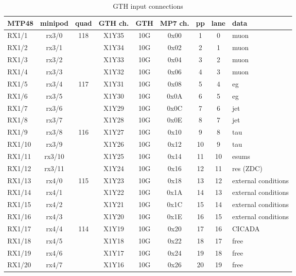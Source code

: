 \begin{longtable}{|l|c|c|c|c|c|c|c|l|}
\caption{GTH input connections}
    \label{tab:app:gth_i_conn}\\
\hline
\textbf{MTP48}& \textbf{minipod}& \textbf{quad}& \textbf{GTH ch.}& \textbf{GTH}& \textbf{MP7 ch.} &\textbf{pp}& \textbf{lane}& \textbf{data}\\
\hline
\hline
\endhead
RX1/1  & rx3/0  & 118 & X1Y35 & 10G & 0x00 & 1  & 0  & muon\\\hline
RX1/2  & rx3/1  &     & X1Y34 & 10G & 0x02 & 2  & 1  & muon\\\hline
RX1/3  & rx3/2  &     & X1Y33 & 10G & 0x04 & 3  & 2  & muon\\\hline
RX1/4  & rx3/3  &     & X1Y32 & 10G & 0x06 & 4  & 3  & muon\\\hline
RX1/5  & rx3/4  & 117 & X1Y31 & 10G & 0x08 & 5  & 4  & eg\\\hline
RX1/6  & rx3/5  &     & X1Y30 & 10G & 0x0A & 6  & 5  & eg\\\hline
RX1/7  & rx3/6  &     & X1Y29 & 10G & 0x0C & 7  & 6  & jet\\\hline
RX1/8  & rx3/7  &     & X1Y28 & 10G & 0x0E & 8  & 7  & jet\\\hline
RX1/9  & rx3/8  & 116 & X1Y27 & 10G & 0x10 & 9  & 8  & tau\\\hline
RX1/10 & rx3/9  &     & X1Y26 & 10G & 0x12 & 10 & 9  & tau\\\hline
RX1/11 & rx3/10 &     & X1Y25 & 10G & 0x14 & 11 & 10 & esums\\\hline
RX1/12 & rx3/11 &     & X1Y24 & 10G & 0x16 & 12 & 11 & res (ZDC)\\\hline
RX1/13 & rx4/0  & 115 & X1Y23 & 10G & 0x18 & 13 & 12 & external conditions\\\hline
RX1/14 & rx4/1  &     & X1Y22 & 10G & 0x1A & 14 & 13 & external conditions\\\hline
RX1/15 & rx4/2  &     & X1Y21 & 10G & 0x1C & 15 & 14 & external conditions\\\hline
RX1/16 & rx4/3  &     & X1Y20 & 10G & 0x1E & 16 & 15 & external conditions\\\hline
RX1/17 & rx4/4  & 114 & X1Y19 & 10G & 0x20 & 17 & 16 & CICADA\\\hline
RX1/18 & rx4/5  &     & X1Y18 & 10G & 0x22 & 18 & 17 & free\\\hline
RX1/19 & rx4/6  &     & X1Y17 & 10G & 0x24 & 19 & 18 & free\\\hline
RX1/20 & rx4/7  &     & X1Y16 & 10G & 0x26 & 20 & 19 & free\\\hline

\end{longtable}
